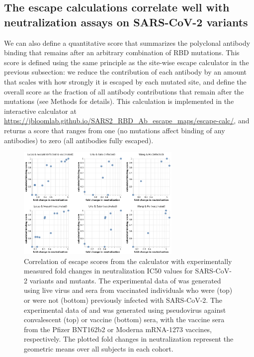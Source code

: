 \documentclass[9pt,twocolumn,twoside]{gsajnl_modified}
\begin{document}
\subsection{The escape calculations correlate well with neutralization assays on SARS-CoV-2 variants}
We can also define a quantitative score that summarizes the polyclonal antibody binding that remains after an arbitrary combination of RBD mutations.
This score is defined using the same principle as the site-wise escape calculator in the previous subsection: we reduce the contribution of each antibody by an amount that scales with how strongly it is escaped by each mutated site, and define the overall score as the fraction of all antibody contributions that remain after the mutations (see Methods for details).
This calculation is implemented in the interactive calculator at \url{https://jbloomlab.github.io/SARS2_RBD_Ab_escape_maps/escape-calc/}, and returns a score that ranges from one (no mutations affect binding of any antibodies) to zero (all antibodies fully escaped).

\begin{figure}
\includegraphics[width=0.7\textwidth]{../results/neut_studies/neut_studies.png}
\caption{Correlation of escape scores from the calculator with experimentally measured fold changes in neutralization IC50 values for SARS-CoV-2 variants and mutants.
The experimental data of \citet{lucas2021impact} was generated using live virus and sera from vaccinated individuals who were (top) or were not (bottom) previously infected with SARS-CoV-2.
The experimental data of \citet{uriu2021neutralization} and \citet{wang2021antibody} was generated using pseudovirus against convalescent (top) or vaccine (bottom) sera, with the vaccine sera from the Pfizer BNT162b2 or Moderna mRNA-1273 vaccines, respectively. 
The plotted fold changes in neutralization represent the geometric means over all subjects in each cohort.
}
\label{fig:neut_studies}
\end{figure}
\end{document}

